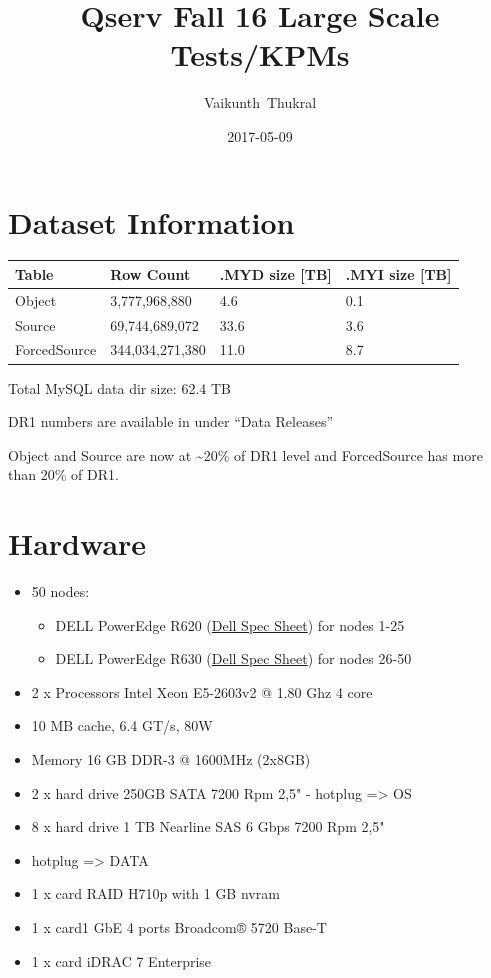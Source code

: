 \documentclass[DM,toc]{lsstdoc}
\title[Qserv Test Fall 2016]{Qserv Fall 16 Large Scale Tests/KPMs}
\author{Vaikunth~Thukral}
\date{2017-05-09}
\begin{document}
\maketitle

\section{Dataset Information}\label{dataset-information}

\begin{longtable}[]{@{}llll@{}}
\toprule
\textbf{Table} & \textbf{Row Count} & \textbf{.MYD size {[}TB{]}} &
\textbf{.MYI size {[}TB{]}}\tabularnewline
\midrule
\endhead
Object & 3,777,968,880 & 4.6 & 0.1\tabularnewline
Source & 69,744,689,072 & 33.6 & 3.6\tabularnewline
ForcedSource & 344,034,271,380 & 11.0 & 8.7\tabularnewline
\bottomrule
\end{longtable}

Total MySQL data dir size: 62.4 TB

DR1 numbers are available in 
under ``Data Releases''

Object and Source are now at \textasciitilde{}20\% of DR1 level and
ForcedSource has more than 20\% of DR1.

\section{Hardware}\label{hardware}

\begin{itemize}
\item
  50 nodes:

  \begin{itemize}
  \item
    DELL PowerEdge R620
    (\href{http://www.dell.com/downloads/global/products/pedge/en/Dell_PowerEdge_R620_Spec_Sheet.pdf}{Dell
    Spec Sheet}) for nodes 1-25
  \item
    DELL PowerEdge R630
    (\href{http://i.dell.com/sites/doccontent/shared-content/data-sheets/en/Documents/Dell-PowerEdge-R630-Spec-Sheet.pdf}{Dell
    Spec Sheet}) for nodes 26-50
  \end{itemize}
\item
  2 x Processors Intel Xeon E5-2603v2 @ 1.80 Ghz 4 core
\item
  10 MB cache, 6.4 GT/s, 80W
\item
  Memory 16 GB DDR-3 @ 1600MHz (2x8GB)
\item
  2 x hard drive 250GB SATA 7200 Rpm 2,5" - hotplug =\textgreater{} OS
\item
  8 x hard drive 1 TB Nearline SAS 6 Gbps 7200 Rpm 2,5"
\item
  hotplug =\textgreater{} DATA
\item
  1 x card RAID H710p with 1 GB nvram
\item
  1 x card1 GbE 4 ports Broadcom® 5720 Base-T
\item
  1 x card iDRAC 7 Enterprise
\end{itemize}
\end{document}
